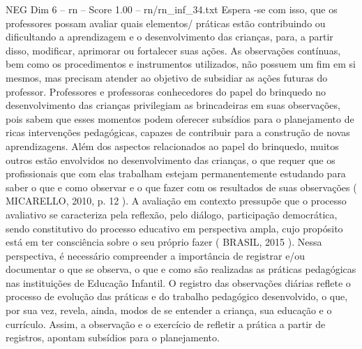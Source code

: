 \begin{textsample}{NEG Dim 6 – rn – Score 1.00 – rn/rn\_inf\_34.txt}
Espera -se com isso, que os professores possam avaliar quais elementos/ práticas estão contribuindo ou dificultando a aprendizagem e o desenvolvimento das crianças, para, a partir disso, modificar, aprimorar ou fortalecer suas ações.
As observações contínuas, bem como os procedimentos e instrumentos utilizados, não possuem um fim em si mesmos, mas precisam atender ao objetivo de subsidiar as ações futuras do professor.
Professores e professoras conhecedores do papel do brinquedo no desenvolvimento das crianças privilegiam as brincadeiras em suas observações, pois sabem que esses momentos podem oferecer subsídios para o planejamento de ricas intervenções pedagógicas, capazes de contribuir para a construção de novas aprendizagens.
Além dos aspectos relacionados ao papel do brinquedo, muitos outros estão envolvidos no desenvolvimento das crianças, o que requer que os profissionais que com elas trabalham estejam permanentemente estudando para saber o que e como observar e o que fazer com os resultados de suas observações ( MICARELLO, 2010, p. 12 ).
A avaliação em contexto pressupõe que o processo avaliativo se caracteriza pela reflexão, pelo diálogo, participação democrática, sendo constitutivo do processo educativo em perspectiva ampla, cujo propósito está em ter consciência sobre o seu próprio fazer ( BRASIL, 2015 ).
Nessa perspectiva, é necessário compreender a importância de registrar e/ou documentar o que se observa, o que e como são realizadas as práticas pedagógicas nas instituições de Educação Infantil.
O registro das observações diárias reflete o processo de evolução das práticas e do trabalho pedagógico desenvolvido, o que, por sua vez, revela, ainda, modos de se entender a criança, sua educação e o currículo.
Assim, a observação e o exercício de refletir a prática a partir de registros, apontam subsídios para o planejamento.

\end{textsample}
